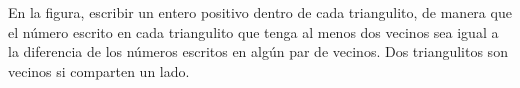 En la figura, escribir un entero positivo dentro de cada triangulito, de manera que el número escrito en cada triangulito que tenga al menos dos vecinos sea igual a la diferencia de los números escritos en algún par de vecinos. Dos triangulitos son vecinos si comparten un lado.
